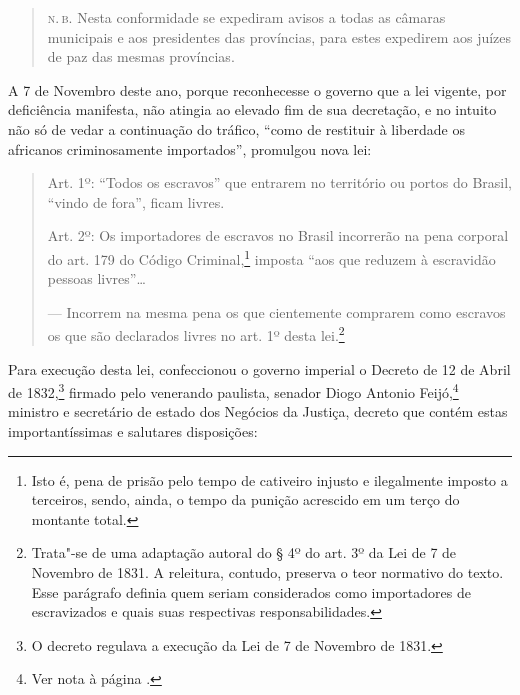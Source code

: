 \begin{quote}
\textsc{n.\,b.} Nesta conformidade se expediram avisos a todas as câmaras
municipais e aos presidentes das províncias, para estes expedirem aos
juízes de paz das mesmas províncias.
\end{quote}

A 7 de Novembro deste ano, porque reconhecesse o governo que a lei
vigente, por deficiência manifesta, não atingia ao elevado fim de sua
decretação, e no intuito não só de vedar a continuação do tráfico, ``como
de restituir à liberdade os africanos criminosamente importados'',
promulgou nova lei:

\begin{quote}
\forceindent{}Art. 1º: ``Todos os escravos'' que entrarem no território ou portos do
Brasil, ``vindo de fora'', ficam livres.

Art. 2º: Os importadores de escravos no Brasil incorrerão na pena
corporal do art. 179 do Código Criminal,\footnote{Isto é, pena de
  prisão pelo tempo de cativeiro injusto e ilegalmente imposto a
  terceiros, sendo, ainda, o tempo da punição acrescido em um terço do
  montante total.} imposta ``aos que reduzem à escravidão pessoas
livres''\ldots{}

--- Incorrem na mesma pena os que cientemente comprarem como escravos os
que são declarados livres no art. 1º desta lei.\footnote{Trata"-se de
  uma adaptação autoral do § 4º do art. 3º da Lei de 7 de Novembro de
  1831. A releitura, contudo, preserva o teor normativo do texto. Esse
  parágrafo definia quem seriam considerados como
  importadores de escravizados e quais suas respectivas
  responsabilidades.}
\end{quote}

Para execução desta lei, confeccionou o governo imperial o Decreto de 12
de Abril de 1832,\footnote{O decreto regulava a execução da Lei de 7 de
  Novembro de 1831.} firmado pelo venerando paulista, senador Diogo
Antonio Feijó,\footnote{Ver nota à página \pageref{feijo}.} ministro e secretário de
estado dos Negócios da Justiça, decreto que contém estas
importantíssimas e salutares disposições:

